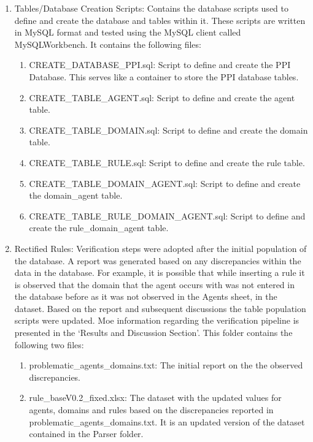 \documentclass[msc,deptreport,ai]{infthesis}      %
\begin{document}
\begin{enumerate}
 	\item Tables/Database Creation Scripts: Contains the database scripts used to define and create the database and tables within it. These scripts are written in MySQL format and tested using the MySQL client called MySQLWorkbench. It contains the following files:
 	 	 	\begin{enumerate}
 		\item CREATE\_DATABASE\_PPI.sql: Script to define and create the PPI Database. This serves like a container to store the PPI database tables.
 		\item CREATE\_TABLE\_AGENT.sql: Script to define and create the agent table.
 		\item CREATE\_TABLE\_DOMAIN.sql: Script to define and create the domain table.
 		\item CREATE\_TABLE\_RULE.sql: Script to define and create the rule table.
 		\item CREATE\_TABLE\_DOMAIN\_AGENT.sql: Script to define and create the domain\_agent table.
 		\item CREATE\_TABLE\_RULE\_DOMAIN\_AGENT.sql:  Script to define and create the rule\_domain\_agent table.
 	\end{enumerate}
 
 \item Rectified Rules:  Verification steps were adopted after the initial population of the database. A report was generated based on any discrepancies within the data in the database. For example, it is possible that while inserting a rule it is observed that the domain that the agent occurs with was not entered in the database before as it was not observed in the Agents sheet, in the dataset. Based on the report and subsequent discussions the table population scripts were updated. Moe information regarding the verification pipeline is presented in the `Results and Discussion Section'. This folder contains the following two files:
    \begin{enumerate}
   	\item problematic\_agents\_domains.txt: The initial report on the the observed discrepancies.
   	\item rule\_baseV0.2\_fixed.xlsx: The dataset with the updated values for agents, domains and rules based on the discrepancies reported in\\ problematic\_agents\_domains.txt. It is an updated version of the dataset contained in the Parser folder.
   \end{enumerate}
 \end{enumerate}
	
\end{document}
